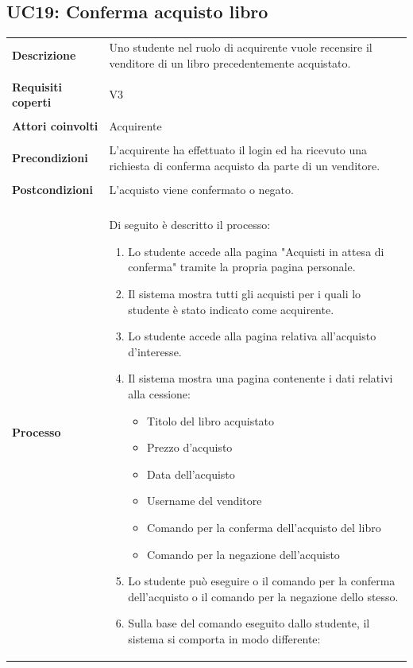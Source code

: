 \documentclass[10pt,a4paper]{report}
\begin{document}
	\subsection{UC19: Conferma acquisto libro}
	\begin{tabular}{lp{}}
		\textbf{Descrizione}&Uno studente nel ruolo di acquirente vuole recensire il venditore di un libro precedentemente acquistato.\\
		\\
		\textbf{Requisiti coperti}&V3\\
		\\
		\textbf{Attori coinvolti}&Acquirente\\
		\\
		\textbf{Precondizioni}&L'acquirente ha effettuato il login ed ha ricevuto una richiesta di conferma acquisto da parte di un venditore.\\
		\\
		\textbf{Postcondizioni}&L'acquisto viene confermato o negato.\\
		\\
		\textbf{Processo}&Di seguito è descritto il processo:
		\begin{enumerate}
			\item Lo studente accede alla pagina "Acquisti in attesa di conferma" tramite la propria pagina personale.
			\item Il sistema mostra tutti gli acquisti per i quali lo studente è stato indicato come acquirente.
			\item Lo studente accede alla pagina relativa all'acquisto d'interesse.
			\item Il sistema mostra una pagina contenente i dati relativi alla cessione:
			\begin{itemize}
				\item Titolo del libro acquistato
				\item Prezzo d'acquisto
				\item Data dell'acquisto
				\item Username del venditore
				\item Comando per la conferma dell'acquisto del libro
				\item Comando per la negazione dell'acquisto
			\end{itemize}
			\item Lo studente può eseguire o il comando per la conferma dell'acquisto o il comando per la negazione dello stesso.
			\item Sulla base del comando eseguito dallo studente, il sistema si comporta in modo differente:

\end{enumerate}
\end{tabular}
\end{document}
